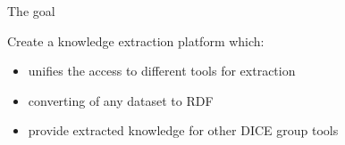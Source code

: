 \begin{frame}{The goal}

Create a knowledge extraction platform which:

\begin{itemize}
	\item unifies the access to different tools for extraction 
	\item converting of any dataset to RDF
	\item provide extracted knowledge for other DICE group tools
\end{itemize}

\end{frame}